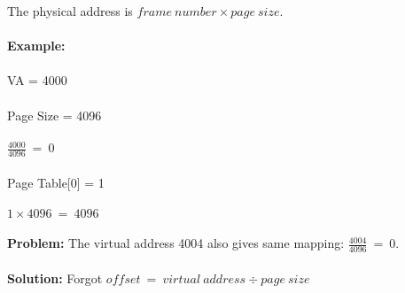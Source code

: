 \documentclass[../base_file/cs1550_notes.tex]{subfiles}
\begin{document}
The physical address is $frame\ number\times page\ size$.\\\\
\textbf{Example:}\\\\
VA = 4000\\\\
Page Size = 4096\\\\
$\frac{4000}{4096}\ =\ 0$\\\\
Page Table[0] = 1\\\\
$1\times 4096\ =\ 4096$\\\\
\textbf{Problem:}
The virtual address 4004 also gives same mapping: $\frac{4004}{4096}\ =\ 0$.\\\\
\textbf{Solution:} Forgot $offset\ =\ virtual\ address\div page\ size$
\end{document}
